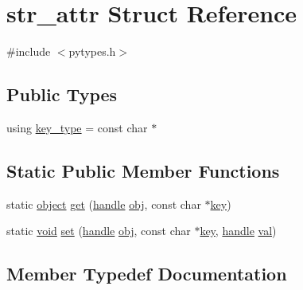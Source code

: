 \hypertarget{structstr__attr}{}\section{str\+\_\+attr Struct Reference}
\label{structstr__attr}


{\ttfamily \#include $<$pytypes.\+h$>$}

\subsection*{Public Types}
\begin{DoxyCompactItemize}
\item 
using \mbox{\hyperlink{structstr__attr_ac6715dfd0dc3e39e4ee71f2eed8939b7}{key\+\_\+type}} = const char $\ast$
\end{DoxyCompactItemize}
\subsection*{Static Public Member Functions}
\begin{DoxyCompactItemize}
\item 
static \mbox{\hyperlink{classobject}{object}} \mbox{\hyperlink{structstr__attr_aba6a5f0515f28d5f3ff827559ac3446b}{get}} (\mbox{\hyperlink{classhandle}{handle}} \mbox{\hyperlink{_s_d_l__opengl__glext_8h_a0c0d4701a6c89f4f7f0640715d27ab26}{obj}}, const char $\ast$\mbox{\hyperlink{setobject_8h_ab06f52e01abcbec81a27c56570d3c10b}{key}})
\item 
static \mbox{\hyperlink{_s_d_l__opengles2__gl2ext_8h_ae5d8fa23ad07c48bb609509eae494c95}{void}} \mbox{\hyperlink{structstr__attr_a547cb1910803f5a385d742f0a7dc7b78}{set}} (\mbox{\hyperlink{classhandle}{handle}} \mbox{\hyperlink{_s_d_l__opengl__glext_8h_a0c0d4701a6c89f4f7f0640715d27ab26}{obj}}, const char $\ast$\mbox{\hyperlink{setobject_8h_ab06f52e01abcbec81a27c56570d3c10b}{key}}, \mbox{\hyperlink{classhandle}{handle}} \mbox{\hyperlink{_s_d_l__opengl__glext_8h_a26942fd2ed566ef553eae82d2c109c8f}{val}})
\end{DoxyCompactItemize}


\subsection{Member Typedef Documentation}
\mbox{\label{structstr__attr_ac6715dfd0dc3e39e4ee71f2eed8939b7}} 
